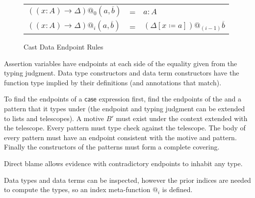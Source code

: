 \begin{figure}
\begin{tabular}{lll}
  $\left(\left(x:A\right)\rightarrow\Delta\right)@_{0}\left(a,\overline{b}\right)$ & = & $a:A$\tabularnewline
  $\left(\left(x:A\right)\rightarrow\Delta\right)@_{i}\left(a,\overline{b}\right)$ & = & $\left(\Delta\left[x\coloneqq a\right]\right)@_{\left(i-1\right)}\overline{b}$\tabularnewline
\end{tabular}
  
\caption{Cast Data Endpoint Rules}
\label{fig:cast-Data-Endpoint-Rules}
\end{figure}

Assertion variables have endpoints at each side of the equality given from the typing judgment.
Data type constructors and data term constructors have the function type implied by their definitions (and annotations that match).

To find the endpoints of a $\mathsf{case}$ expression first, find the endpoints of the \scruts{} and a pattern that it types under (the endpoint and typing judgment can be extended to lists and telescopes).
A motive $B'$ must exist under the context extended with the telescope.
Every pattern must type check against the telescope.
The body of every pattern must have an endpoint consistent with the motive and pattern.
Finally the constructors of the patterns must form a complete covering.
  
Direct blame allows evidence with contradictory endpoints to inhabit any type.

Data types and data terms can be inspected, however the prior indices are needed to compute the types, so an index meta-function $@_{i}$ is defined.

